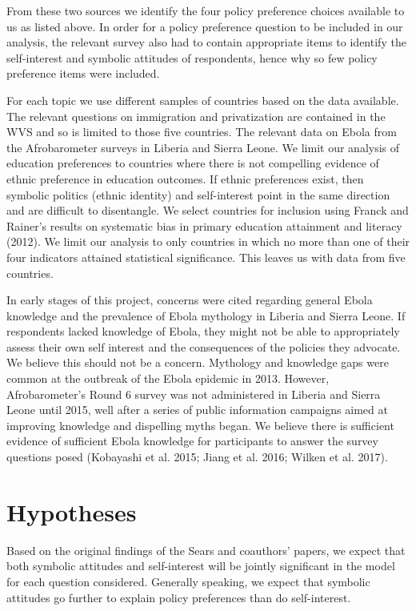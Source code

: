 \documentclass[]{article}
\begin{document}
From these two sources we identify the four policy preference choices
available to us as listed above. In order for a policy preference
question to be included in our analysis, the relevant survey also had to
contain appropriate items to identify the self-interest and symbolic
attitudes of respondents, hence why so few policy preference items were
included.

For each topic we use different samples of countries based on the data
available. The relevant questions on immigration and privatization are
contained in the WVS and so is limited to those five countries. The
relevant data on Ebola from the Afrobarometer surveys in Liberia and
Sierra Leone. We limit our analysis of education preferences to
countries where there is not compelling evidence of ethnic preference in
education outcomes. If ethnic preferences exist, then symbolic politics
(ethnic identity) and self-interest point in the same direction and are
difficult to disentangle. We select countries for inclusion using Franck
and Rainer's results on systematic bias in primary education attainment
and literacy (2012). We limit our analysis to only countries in which no
more than one of their four indicators attained statistical
significance. This leaves us with data from five countries.

In early stages of this project, concerns were cited regarding general
Ebola knowledge and the prevalence of Ebola mythology in Liberia and
Sierra Leone. If respondents lacked knowledge of Ebola, they might not
be able to appropriately assess their own self interest and the
consequences of the policies they advocate. We believe this should not
be a concern. Mythology and knowledge gaps were common at the outbreak
of the Ebola epidemic in 2013. However, Afrobarometer's Round 6 survey
was not administered in Liberia and Sierra Leone until 2015, well after
a series of public information campaigns aimed at improving knowledge
and dispelling myths began. We believe there is sufficient evidence of
sufficient Ebola knowledge for participants to answer the survey
questions posed (Kobayashi et al. 2015; Jiang et al. 2016; Wilken et al.
2017).

\section{Hypotheses}\label{hypotheses}

Based on the original findings of the Sears and coauthors' papers, we
expect that both symbolic attitudes and self-interest will be jointly
significant in the model for each question considered. Generally
speaking, we expect that symbolic attitudes go further to explain policy
preferences than do self-interest.
\end{document}
